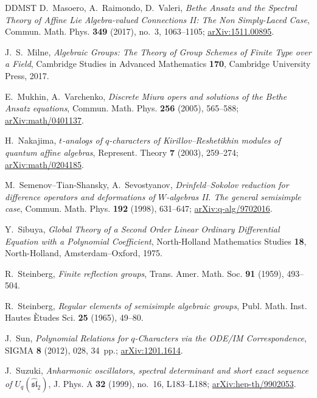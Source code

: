 \documentclass[11pt,leqno]{amsart}
\numberwithin{equation}{section}
\theoremstyle{plain}
\theoremstyle{definition}
\theoremstyle{plain}
\theoremstyle{definition}
\theoremstyle{remark}
\begin{document}
\begin{thebibliography}{DDMST}
D.~Masoero, A.~Raimondo, D.~Valeri,
\emph{Bethe Ansatz and the Spectral Theory of Affine Lie Algebra-valued Connections II: The Non Simply-Laced Case},
Commun. Math. Phys. \textbf{349} (2017), no.~3, 1063--1105; \href{https://arxiv.org/abs/1511.00895}{arXiv:1511.00895}.

J.~S.~Milne,
\emph{Algebraic Groups: The Theory of Group Schemes of Finite Type over a Field},
Cambridge Studies in Advanced Mathematics \textbf{170},
Cambridge University Press, 2017.

E.~Mukhin, A.~Varchenko,
\emph{Discrete Miura opers and solutions of the Bethe Ansatz equations},
Commun. Math. Phys. \textbf{256} (2005), 565--588; \href{https://arxiv.org/abs/math/0401137}{arXiv:math/0401137}.

H.~Nakajima,
\emph{$t$-analogs of $q$-characters of Kirillov--Reshetikhin modules of quantum affine algebras},
Represent. Theory \textbf{7} (2003), 259--274; \href{https://arxiv.org/abs/math/0204185}{arXiv:math/0204185}.

M.~Semenov--Tian-Shansky, A.~Sevostyanov,
\emph{Drinfeld--Sokolov reduction for difference operators and deformations of $W$-algebras II. The general semisimple case},
Commun. Math. Phys. \textbf{192} (1998), 631--647; \href{https://arxiv.org/abs/q-alg/9702016}{arXiv:q-alg/9702016}.

Y.~Sibuya,
\emph{Global Theory of a Second Order Linear Ordinary Differential Equation with a Polynomial Coefficient},
North-Holland Mathematics Studies \textbf{18}, North-Holland, Amsterdam--Oxford, 1975.

R.~Steinberg,
\emph{Finite reflection groups},
Trans. Amer. Math. Soc. \textbf{91} (1959), 493--504.

R.~Steinberg,
\emph{Regular elements of semisimple algebraic groups},
Publ. Math. Inst. Hautes \`Etudes Sci. \textbf{25} (1965), 49--80.

J.~Sun,
\emph{Polynomial Relations for $q$-Characters via the ODE/IM Correspondence},
SIGMA \textbf{8} (2012), 028, 34~pp.; \href{https://arxiv.org/abs/1201.1614}{arXiv:1201.1614}.

J.~Suzuki,
\emph{Anharmonic oscillators, spectral determinant and short exact sequence of $U_q(\widehat{\mathfrak{sl}}_2)$},
J. Phys. A \textbf{32} (1999), no.~16, L183--L188; \href{https://arxiv.org/abs/hep-th/9902053}{arXiv:hep-th/9902053}.


\end{thebibliography}
\end{document}
